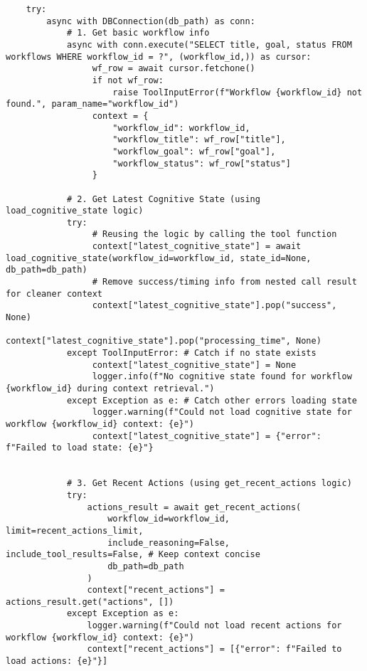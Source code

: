 \documentclass[12pt,a4paper]{article}
\begin{document}
\begin{pageablecode}
\begin{verbatim}
    try:
        async with DBConnection(db_path) as conn:
            # 1. Get basic workflow info
            async with conn.execute("SELECT title, goal, status FROM workflows WHERE workflow_id = ?", (workflow_id,)) as cursor:
                 wf_row = await cursor.fetchone()
                 if not wf_row: 
                     raise ToolInputError(f"Workflow {workflow_id} not found.", param_name="workflow_id")
                 context = {
                     "workflow_id": workflow_id,
                     "workflow_title": wf_row["title"],
                     "workflow_goal": wf_row["goal"],
                     "workflow_status": wf_row["status"]
                 }

            # 2. Get Latest Cognitive State (using load_cognitive_state logic)
            try:
                 # Reusing the logic by calling the tool function
                 context["latest_cognitive_state"] = await load_cognitive_state(workflow_id=workflow_id, state_id=None, db_path=db_path)
                 # Remove success/timing info from nested call result for cleaner context
                 context["latest_cognitive_state"].pop("success", None)
                 context["latest_cognitive_state"].pop("processing_time", None)
            except ToolInputError: # Catch if no state exists
                 context["latest_cognitive_state"] = None
                 logger.info(f"No cognitive state found for workflow {workflow_id} during context retrieval.")
            except Exception as e: # Catch other errors loading state
                 logger.warning(f"Could not load cognitive state for workflow {workflow_id} context: {e}")
                 context["latest_cognitive_state"] = {"error": f"Failed to load state: {e}"}


            # 3. Get Recent Actions (using get_recent_actions logic)
            try:
                actions_result = await get_recent_actions(
                    workflow_id=workflow_id, limit=recent_actions_limit,
                    include_reasoning=False, include_tool_results=False, # Keep context concise
                    db_path=db_path
                )
                context["recent_actions"] = actions_result.get("actions", [])
            except Exception as e:
                logger.warning(f"Could not load recent actions for workflow {workflow_id} context: {e}")
                context["recent_actions"] = [{"error": f"Failed to load actions: {e}"}]



\end{verbatim}
\end{pageablecode}
\end{document}
